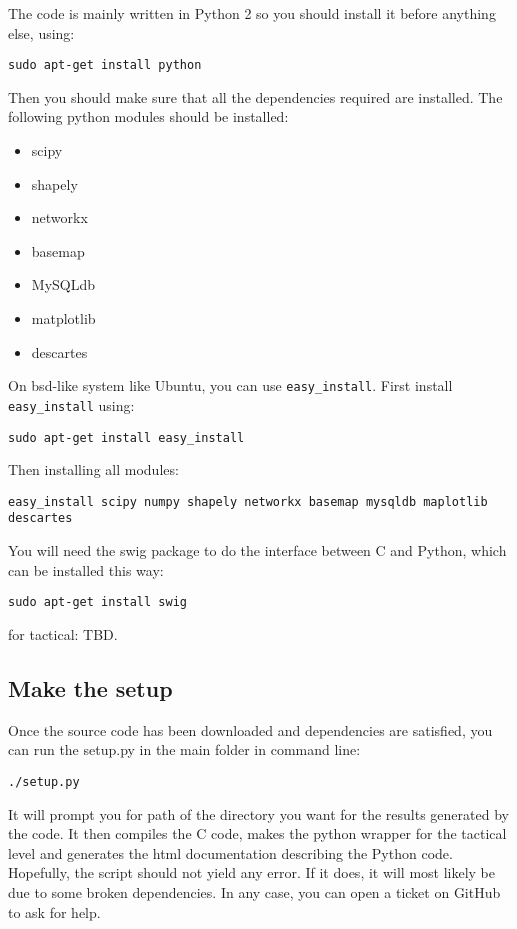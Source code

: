 \documentclass[12pt]{article}
\begin{document}
The code is mainly written in Python 2 so you should install it before anything else, using:

\begin{verbatim}
sudo apt-get install python
\end{verbatim}

Then you should make sure that all the dependencies required are installed. The following python modules should be installed:

\begin{itemize}
\item scipy
\item shapely
\item networkx
\item basemap
\item MySQLdb
\item matplotlib
\item descartes
\end{itemize}

On bsd-like system like Ubuntu, you can use \verb|easy_install|. First install \verb|easy_install| using:

\begin{verbatim}
sudo apt-get install easy_install 
\end{verbatim}

Then installing all modules:

\begin{verbatim}
easy_install scipy numpy shapely networkx basemap mysqldb maplotlib descartes
\end{verbatim}

You will need the swig package to do the interface between C and Python, which can be installed this way:
\begin{verbatim}
sudo apt-get install swig
\end{verbatim}

for tactical: TBD.

\subsection{Make the setup}

Once the source code has been downloaded and dependencies are satisfied, you can run the setup.py in the main folder in command line:

\begin{verbatim}
./setup.py
\end{verbatim}

It will prompt you for path of the directory you want for the results generated by the code. It then compiles the C code, makes the python wrapper for the tactical level and generates the html documentation describing the Python code. Hopefully, the script should not yield any error. If it does, it will most likely be due to some broken dependencies. In any case, you can open a ticket on GitHub to ask for help. 
\end{document}
